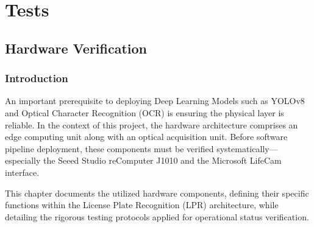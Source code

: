 %
%
%

\chapter{Tests} \label{ch:hardware_test}


\section{Hardware Verification}

\subsection{Introduction}
An important prerequisite to deploying Deep Learning Models such as YOLOv8 and Optical Character Recognition (OCR) is ensuring the physical layer is reliable. 
In the context of this project, the hardware architecture comprises an edge computing unit along with an optical acquisition unit. Before software pipeline deployment, these components must be verified systematically—especially the Seeed Studio reComputer J1010 and the Microsoft LifeCam interface. 

This chapter documents the utilized hardware components, defining their specific functions within the License Plate Recognition (LPR) architecture, while detailing the rigorous testing protocols applied for operational status verification.

